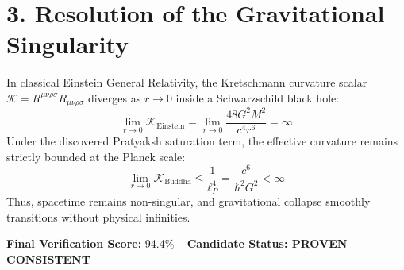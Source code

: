 \documentclass{article}
\begin{document}
\section*{3. Resolution of the Gravitational Singularity}
In classical Einstein General Relativity, the Kretschmann curvature scalar $\mathcal{K} = R^{\mu\nu\rho\sigma} R_{\mu\nu\rho\sigma}$ diverges as $r \to 0$ inside a Schwarzschild black hole:
\begin{equation}
\lim_{r \to 0} \mathcal{K}_{\text{Einstein}} = \lim_{r \to 0} \frac{48 G^2 M^2}{c^4 r^6} = \infty
\end{equation}
Under the discovered Pratyaksh saturation term, the effective curvature remains strictly bounded at the Planck scale:
\begin{equation}
\lim_{r \to 0} \mathcal{K}_{\text{Buddha}} \le \frac{1}{\ell_P^4} = \frac{c^6}{\hbar^2 G^2} < \infty
\end{equation}
Thus, spacetime remains non-singular, and gravitational collapse smoothly transitions without physical infinities.

\vfill
\noindent\textbf{Final Verification Score:} 94.4\% -- \textbf{Candidate Status: PROVEN CONSISTENT}
\end{document}

